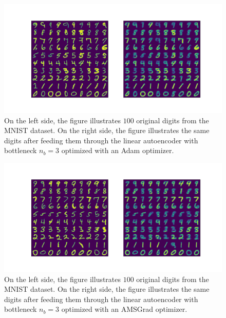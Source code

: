 \begin{figure}
\begin{center}
   \begin{minipage}[b]{\linewidth}
      \includegraphics[trim = 15mm 10mm 15mm 15mm, clip, width=\linewidth]{linear_AE_3d_adam_inference}
	\end{minipage}
\end{center}
\caption{On the left side, the figure illustrates $100$ original digits from the MNIST dataset. On the right side, the figure illustrates the same digits after feeding them through the linear autoencoder with bottleneck $n_b=3$ optimized with an Adam optimizer.}\label{fig:linear_AE_3d_adam_inference}
\end{figure}


\begin{figure}
\begin{center}
   \begin{minipage}[b]{\linewidth}
      \includegraphics[trim = 15mm 10mm 15mm 15mm, clip, width=\linewidth]{linear_AE_3d_amsgrad_inference}
	\end{minipage}
\end{center}
\caption{On the left side, the figure illustrates $100$ original digits from the MNIST dataset. On the right side, the figure illustrates the same digits after feeding them through the linear autoencoder with bottleneck $n_b=3$ optimized with an AMSGrad optimizer.}\label{fig:linear_AE_3d_amsgrad_inference}
\end{figure}


